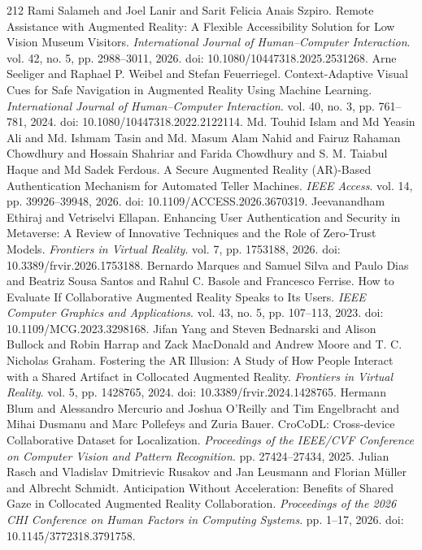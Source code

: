 \begin{thebibliography}{212}
 Rami Salameh and Joel Lanir and Sarit Felicia Anais Szpiro. Remote Assistance with Augmented Reality: A Flexible Accessibility Solution for Low Vision Museum Visitors. \emph{International Journal of Human--Computer Interaction}. vol. 42, no. 5, pp. 2988--3011, 2026. doi: 10.1080/10447318.2025.2531268.
 Arne Seeliger and Raphael P. Weibel and Stefan Feuerriegel. Context-Adaptive Visual Cues for Safe Navigation in Augmented Reality Using Machine Learning. \emph{International Journal of Human--Computer Interaction}. vol. 40, no. 3, pp. 761--781, 2024. doi: 10.1080/10447318.2022.2122114.
 Md. Touhid Islam and Md Yeasin Ali and Md. Ishmam Tasin and Md. Masum Alam Nahid and Fairuz Rahaman Chowdhury and Hossain Shahriar and Farida Chowdhury and S. M. Taiabul Haque and Md Sadek Ferdous. A Secure Augmented Reality ({AR})-Based Authentication Mechanism for Automated Teller Machines. \emph{IEEE Access}. vol. 14, pp. 39926--39948, 2026. doi: 10.1109/ACCESS.2026.3670319.
 Jeevanandham Ethiraj and Vetriselvi Ellapan. Enhancing User Authentication and Security in Metaverse: A Review of Innovative Techniques and the Role of Zero-Trust Models. \emph{Frontiers in Virtual Reality}. vol. 7, pp. 1753188, 2026. doi: 10.3389/frvir.2026.1753188.
 Bernardo Marques and Samuel Silva and Paulo Dias and Beatriz Sousa Santos and Rahul C. Basole and Francesco Ferrise. How to Evaluate If Collaborative Augmented Reality Speaks to Its Users. \emph{IEEE Computer Graphics and Applications}. vol. 43, no. 5, pp. 107--113, 2023. doi: 10.1109/MCG.2023.3298168.
 Jifan Yang and Steven Bednarski and Alison Bullock and Robin Harrap and Zack MacDonald and Andrew Moore and T. C. Nicholas Graham. Fostering the {AR} Illusion: A Study of How People Interact with a Shared Artifact in Collocated Augmented Reality. \emph{Frontiers in Virtual Reality}. vol. 5, pp. 1428765, 2024. doi: 10.3389/frvir.2024.1428765.
 Hermann Blum and Alessandro Mercurio and Joshua O'Reilly and Tim Engelbracht and Mihai Dusmanu and Marc Pollefeys and Zuria Bauer. {CroCoDL}: Cross-device Collaborative Dataset for Localization. \emph{Proceedings of the IEEE/CVF Conference on Computer Vision and Pattern Recognition}. pp. 27424--27434, 2025.
 Julian Rasch and Vladislav Dmitrievic Rusakov and Jan Leusmann and Florian M{\"u}ller and Albrecht Schmidt. Anticipation Without Acceleration: Benefits of Shared Gaze in Collocated Augmented Reality Collaboration. \emph{Proceedings of the 2026 CHI Conference on Human Factors in Computing Systems}. pp. 1--17, 2026. doi: 10.1145/3772318.3791758.

\end{thebibliography}
